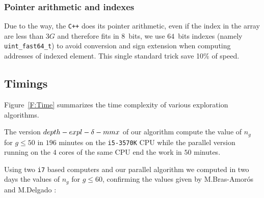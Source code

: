 \documentclass[reqno,11pt]{amsart}
\theoremstyle{plain}
\theoremstyle{definition}
\newcommand{\CPP}{\texttt{C++}\xspace}
\renewcommand{\leq}{\leqslant}
\renewcommand{\tt}[1]{\texttt{#1}}
\begin{document}
\subsubsection*{Pointer arithmetic and indexes}

Due to the way, the \CPP does its pointer arithmetic, even if the index in the
array are less than $3G$ and therefore fits in $8$~bits, we use $64$~bits
indexes (namely \verb|uint_fast64_t|) to avoid conversion and sign extension
when computing addresses of indexed element. This single standard trick save
10\% of speed.

\subsection{Timings}

Figure~\ref{F:Time} summarizes the time complexity of various exploration algorithms.

The version $\small depth-expl-\delta-mmx$ of our algorithm compute the value of $n_g$ for $g\leq 50$ in $196$ minutes on the \tt{i5-3570K} CPU while the parallel version running on the $4$ cores of the same CPU end the work in $50$ minutes.

Using two \tt{i7} based computers and our  parallel algorithm  we computed in two days the values of $n_g$ for $g\leq 60$, confirming the values given by M.Bras-Amor\'os and M.Delgado : 
\end{document}
